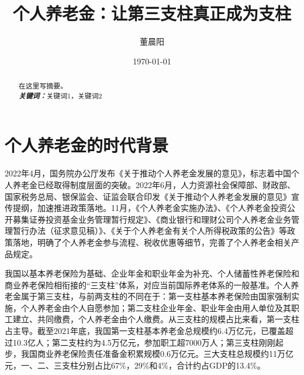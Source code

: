\documentclass[a4paper,12pt]{ctexart}
\title{个人养老金：让第三支柱真正成为支柱}
\author{董晨阳}
\date{\today}
\providecommand{\keywords}[1]{\\\textbf{\textit{关键词：}}#1}
\begin{document}
\maketitle
\begin{abstract}
在这里写摘要。
\keywords{关键词1，关键词2}
\end{abstract}
\clearpage
\section*{个人养老金的时代背景}
2022年4月，国务院办公厅发布《关于推动个人养老金发展的意见》，标志着中国个人养老金已经取得制度层面的突破。2022年6月，人力资源社会保障部、财政部、国家税务总局、银保监会、证监会联合印发《关于推动个人养老金发展的意见》宣传提纲，加速推进政策落地。11月，《个人养老金实施办法》、《个人养老金投资公开募集证券投资基金业务管理暂行规定》、《商业银行和理财公司个人养老金业务管理暂行办法（征求意见稿）》、《关于个人养老金有关个人所得税政策的公告》等政策落地，明确了个人养老金参与流程、税收优惠等细节，完善了个人养老金相关产品规定。

我国以基本养老保险为基础、企业年金和职业年金为补充、个人储蓄性养老保险和商业养老保险相衔接的“三支柱”体系，对应当前国际养老体系的一般基准。个人养老金属于第三支柱，与前两支柱的不同在于：第一支柱基本养老保险由国家强制实施，个人养老金由个人自愿参加；第二支柱企业年金、职业年金由用人单位及其职工建立、共同缴费，个人养老金由个人缴费。从三支柱的规模占比来看，第一支柱占主导。截至2021年底，我国第一支柱基本养老金总规模约6.4万亿元，已覆盖超过10.3亿人；第二支柱约为4.5万亿元，参加职工超7000万人；第三支柱刚刚起步，我国商业养老保险责任准备金积累规模0.6万亿元。三大支柱总规模约11万亿元，一、二、三支柱分别占比67\%，29\%和4\%，合计约占GDP的13.4\%。
\end{document}
